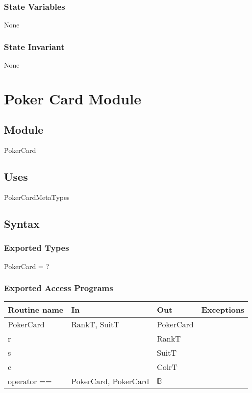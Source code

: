 \documentclass[12pt]{article}
\begin{document}
\subsubsection* {State Variables}

None

\subsubsection* {State Invariant}

None

\newpage
\section* {Poker Card Module}

\subsection*{Module}

PokerCard

\subsection* {Uses}

PokerCardMetaTypes

\subsection* {Syntax}

\subsubsection* {Exported Types}

PokerCard = ?

\subsubsection* {Exported Access Programs}

\begin{tabular}{| l | l | l | l |}
\hline
\textbf{Routine name} & \textbf{In} & \textbf{Out} & \textbf{Exceptions}\\
\hline
PokerCard & RankT, SuitT & PokerCard & \\
\hline
r & ~ & RankT & ~\\
\hline
s & ~ &SuitT & ~\\
\hline
c & ~ &ColrT & ~\\
\hline
operator == & PokerCard, PokerCard & $\mathbb{B}$ & ~\\
\hline
\end{tabular}
\end{document}

